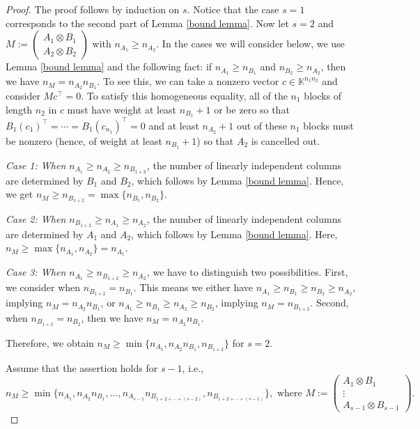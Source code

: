 \documentclass[11pt]{amsart}
\theoremstyle{plain}
\theoremstyle{definition}
\numberwithin{equation}{section}
\newcommand{\K}{\mathbb{K}}
\begin{document}
\begin{proof}
The proof follows by induction on $s$. Notice that the case $s=1$ corresponds to the second part of Lemma \ref{bound lemma}. Now let $s=2$ and $M:=\begin{pmatrix}
A_1 \otimes B_1\\
A_2 \otimes B_2
\end{pmatrix}$ with $n_{A_1}\geq n_{A_2}$. In the cases we will consider below, we use Lemma \ref{bound lemma} and the following fact: if $n_{A_1}\geq n_{B_1}$ and $n_{B_2}\geq n_{A_2}$, then we have $n_M= n_{A_2} n_{B_1}$. To see this, we can take a nonzero vector $c\in\K^{n_1n_2}$ and consider $Mc^\top = 0$. To satisfy this homogeneous equality, all of the $n_1$ blocks of length $n_2$ in $c$ must have weight at least $n_{B_1}+1$ or be zero so that $B_1(c_1)^\top=\cdots=B_1(c_{n_1})^\top=0$ and at least $n_{A_2}+1$ out of these $n_1$ blocks must be nonzero (hence, of weight at least $n_{B_1}+1$) so that $A_2$ is cancelled out. 

\emph{Case 1: When $n_{A_1}\geq n_{A_2}\geq n_{B_{1+2}}$,} the number of linearly independent columns are determined by $B_1$ and $B_2$, which follows by Lemma \ref{bound lemma}. Hence, we get $n_M\geq n_{B_{1+2}}=\max\{n_{B_1},n_{B_2}\}$.

\emph{Case 2: When $n_{B_{1+2}}\geq n_{A_1}\geq n_{A_2}$,} the number of linearly independent columns are determined by $A_1$ and $A_2$, which follows by Lemma \ref{bound lemma}. Here, $n_M\geq\max\{n_{A_1},n_{A_2}\}=n_{A_1}$.

\emph{Case 3: When $n_{A_1}\geq n_{B_{1+2}}\geq n_{A_2}$,} we have to distinguish two possibilities. First, we consider when $n_{B_{1+2}}=n_{B_1}$. This means we either have $n_{A_1}\geq n_{B_1}\geq n_{B_2}\geq n_{A_2}$, implying $n_M= n_{A_2} n_{B_1}$, or $n_{A_1}\geq n_{B_1}\geq n_{A_2}\geq n_{B_2}$, implying $n_M=n_{B_{1+2}}$. Second, when $n_{B_{1+2}}=n_{B_2}$, then we have $n_M= n_{A_2} n_{B_1}$.

Therefore, we obtain $n_M\geq\min\{n_{A_1}, n_{A_2} n_{B_1}, n_{B_{1+2}}\}$ for $s=2$.

Assume that the assertion holds for $s-1$, i.e., 
\begin{equation}\label{ind-hyp}
n_M\geq \min\{n_{A_1},n_{A_2}n_{B_1}, \ldots, n_{A_{s-1}}n_{B_{1+2+\cdots +(s-2)}},n_{B_{1+2+\cdots +(s-1)}}\},
\mbox{\ where\ } M:=\begin{pmatrix}
A_1 \otimes B_1\\
\vdots\\
A_{s-1} \otimes B_{s-1}
\end{pmatrix}.
\end{equation}


\end{proof}
\end{document}

